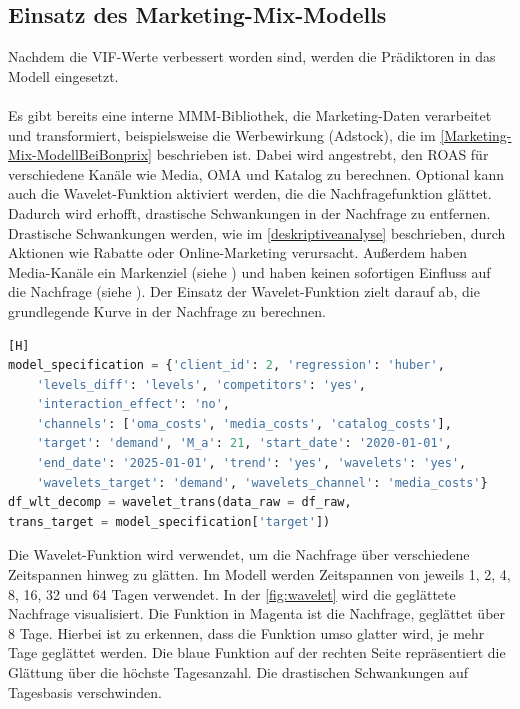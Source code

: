 \subsection{Einsatz des Marketing-Mix-Modells}
\label{EinsatzDesMarketing-Mix-Modells}
Nachdem die \ac{VIF}-Werte verbessert worden sind, werden die Prädiktoren in das Modell eingesetzt. \\\\
Es gibt bereits eine interne \ac{MMM}-Bibliothek, die Marketing-Daten verarbeitet und transformiert, beispielsweise die Werbewirkung (Adstock), die im \autoref{Marketing-Mix-ModellBeiBonprix} beschrieben ist. Dabei wird angestrebt, den \ac{ROAS} für verschiedene Kanäle wie Media, \ac{OMA} und Katalog zu berechnen. Optional kann auch die Wavelet-Funktion aktiviert werden, die die Nachfragefunktion glättet. Dadurch wird erhofft, drastische Schwankungen in der Nachfrage zu entfernen. Drastische Schwankungen werden, wie im \autoref{deskriptiveanalyse} beschrieben, durch Aktionen wie Rabatte oder Online-Marketing verursacht. Außerdem haben Media-Kanäle ein Markenziel (siehe ) und haben keinen sofortigen Einfluss auf die Nachfrage (siehe ). Der Einsatz der Wavelet-Funktion zielt darauf ab, die grundlegende Kurve in der Nachfrage zu berechnen.  
\begin{lstlisting}[language=Python, linewidth=\textwidth][H]
model_specification = {'client_id': 2, 'regression': 'huber', 
    'levels_diff': 'levels', 'competitors': 'yes', 
    'interaction_effect': 'no', 
    'channels': ['oma_costs', 'media_costs', 'catalog_costs'],
    'target': 'demand', 'M_a': 21, 'start_date': '2020-01-01', 
    'end_date': '2025-01-01', 'trend': 'yes', 'wavelets': 'yes', 
    'wavelets_target': 'demand', 'wavelets_channel': 'media_costs'}
df_wlt_decomp = wavelet_trans(data_raw = df_raw, 
trans_target = model_specification['target'])
\end{lstlisting}
Die Wavelet-Funktion wird verwendet, um die Nachfrage über verschiedene Zeitspannen hinweg zu glätten. Im Modell werden Zeitspannen von jeweils 1, 2, 4, 8, 16, 32 und 64 Tagen verwendet. In der \autoref{fig:wavelet} wird die geglättete Nachfrage visualisiert. Die Funktion in Magenta ist die Nachfrage, geglättet über 8 Tage. Hierbei ist zu erkennen, dass die Funktion umso glatter wird, je mehr Tage geglättet werden. Die blaue Funktion auf der rechten Seite repräsentiert die Glättung über die höchste Tagesanzahl. Die drastischen Schwankungen auf Tagesbasis verschwinden. \\\\
